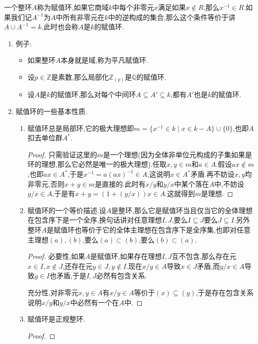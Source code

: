 一个整环$A$称为赋值环,如果它商域$k$中每个非零元$x$满足如果$x\not\in R$,那么$x^{-1}\in R$.如果我们记$A^{-1}$为$A$中所有非零元在$k$中的逆构成的集合,那么这个条件等价于讲$A\cup A^{-1}=k$.此时也会称$A$是$k$的赋值环.
\begin{enumerate}
	\item 例子:
	\begin{itemize}
		\item 如果整环$A$本身就是域,称为平凡赋值环.
		\item 设$p\in\mathbb{Z}$是素数,那么局部化$\mathbb{Z}_{(p)}$是$\mathbb{Q}$的赋值环.
		\item 设$A$是$k$的赋值环,那么对每个中间环$A\subseteq A'\subseteq k$,都有$A'$也是$k$的赋值环.
	\end{itemize}
    \item 赋值环的一些基本性质.
    \begin{enumerate}[(1)]
    	\item 赋值环总是局部环,它的极大理想即$m=\{x^{-1}\in k\mid x\in k-A\}\cup\{0\}$,也即$A$扣去单位群$A^*$.
    	\begin{proof}
    		
    		只需验证这里的$m$是一个理想(因为全体非单位元构成的子集如果是环的理想,那么它必然是唯一的极大理想).任取$x,y\in m$和$a\in A$.假设$ax\not\in m$,也即$ax\in A^*$,于是$x^{-1}=a(ax)^{-1}\in A$,这说明$x\in A^*$矛盾.再不妨设$x,y$均非零元,否则$x+y\in m$是直接的.此时有$x/y$和$y/x$中某个落在$A$中,不妨设$y/x\in A$,于是有$x+y=(1+(y/x))x\in A$.这就得到$m$是理想.
    	\end{proof}
    	\item 赋值环的一个等价描述.设$A$是整环,那么它是赋值环当且仅当它的全体理想在包含序下是一个全序,换句话讲对任意理想$I,J$,要么$I\subseteq J$要么$J\subseteq I$.另外整环$A$是赋值环也等价于它的全体主理想在包含序下是全序集,也即对任意主理想$(a),(b)$,要么$(a)\subset(b)$,要么$(b)\subset(a)$.
    	\begin{proof}
    		
    		必要性,如果$A$是赋值环,如果存在理想$I,J$互不包含,那么存在元$x\in I,x\not\in J$,还存在元$y\in J,y\not\in I$.现在$x/y\in A$导致$x\in J$矛盾,而$y/x\in A$导致$y\in I$也矛盾,于是$I,J$必然有包含关系.
    		
    		充分性,对非零元$x,y\in A$有$x/y\in A$等价于$(x)\subseteq (y)$,于是存在包含关系说明$x/y$和$y/x$中必然有一个在$A$中.
    	\end{proof}
    	\item 赋值环是正规整环.
    	\begin{proof}
    		

\end{proof}
\end{enumerate}
\end{enumerate}
